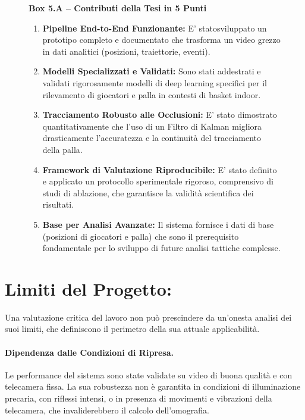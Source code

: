 \documentclass[12pt,a4paper,openright,twoside]{book}
\begin{document}
\begin{figure}[h]
\centering
{}
\label{box:contributi_tesi}
\textbf{Box 5.A -- Contributi della Tesi in 5 Punti}
\begin{enumerate}
  \item \textbf{Pipeline End-to-End Funzionante:} E' statosviluppato 
  un prototipo completo e documentato che trasforma un video grezzo 
  in dati analitici (posizioni, traiettorie, eventi).
  \item \textbf{Modelli Specializzati e Validati:} Sono stati 
  addestrati e validati rigorosamente modelli di deep learning 
  specifici per il rilevamento di giocatori e palla in contesti di 
  basket indoor.
  \item \textbf{Tracciamento Robusto alle Occlusioni:} E' stato 
  dimostrato quantitativamente che l'uso di un Filtro di Kalman
  migliora drasticamente l'accuratezza e la continuità del
  tracciamento della palla.
  \item \textbf{Framework di Valutazione Riproducibile:} E' stato 
  definito e applicato un protocollo sperimentale rigoroso,
  comprensivo di studi di ablazione, che garantisce la validità
  scientifica dei risultati.
  \item \textbf{Base per Analisi Avanzate:} Il sistema
  fornisce i dati di base (posizioni di giocatori e palla) che sono
  il prerequisito fondamentale per lo sviluppo di future analisi
  tattiche complesse.
\end{enumerate}
\end{figure}


\section{Limiti del Progetto:}
\label{sec:limiti-progetto}

Una valutazione critica del lavoro non può prescindere da un'onesta
analisi dei suoi limiti, che definiscono il perimetro della sua
attuale applicabilità.
\paragraph{Dipendenza dalle Condizioni di Ripresa.} 
Le performance del sistema sono state validate su video di buona 
qualità e con telecamera fissa. 
La sua robustezza non è garantita in condizioni di illuminazione 
precaria, con riflessi intensi, o in presenza di movimenti e 
vibrazioni della telecamera, che invaliderebbero il calcolo 
dell'omografia.
\end{document}
